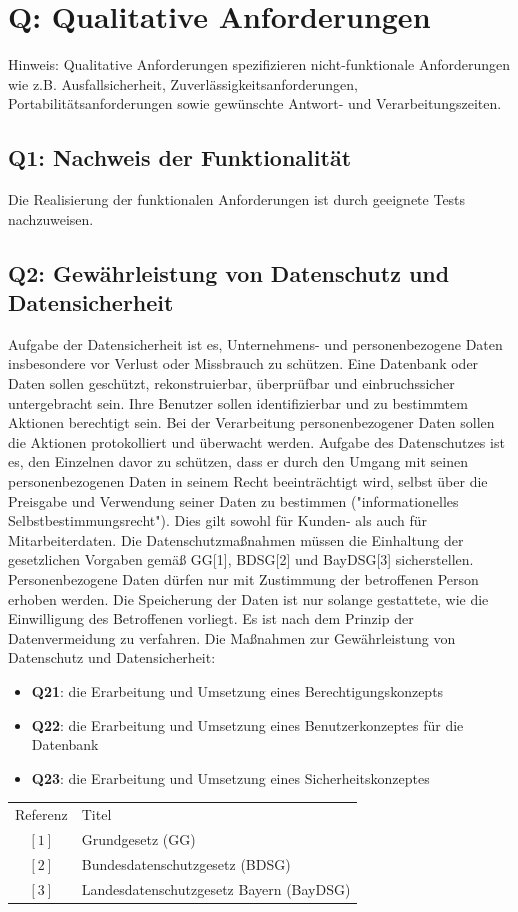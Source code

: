 \documentclass[10pt,a4paper]{scrartcl}
\begin{document}
\section{Q: Qualitative Anforderungen}
Hinweis: Qualitative Anforderungen spezifizieren nicht-funktionale Anforderungen wie z.B. Ausfallsicherheit, Zuverlässigkeitsanforderungen, Portabilitätsanforderungen sowie gewünschte Antwort- und Verarbeitungszeiten.

\subsection{Q1: Nachweis der Funktionalität}
Die Realisierung der funktionalen Anforderungen ist durch geeignete Tests nachzuweisen.

\subsection{Q2: Gewährleistung von Datenschutz und Datensicherheit}
Aufgabe der Datensicherheit ist es, Unternehmens- und personenbezogene Daten insbesondere vor Verlust oder Missbrauch zu schützen. Eine Datenbank oder Daten sollen geschützt, rekonstruierbar, überprüfbar und einbruchssicher untergebracht sein. Ihre Benutzer sollen identifizierbar und zu bestimmtem Aktionen berechtigt sein. Bei der Verarbeitung personenbezogener Daten sollen die Aktionen protokolliert und überwacht werden. Aufgabe des Datenschutzes ist es, den Einzelnen davor zu schützen, dass er durch den Umgang mit seinen personenbezogenen Daten in seinem Recht beeinträchtigt wird, selbst über die Preisgabe und Verwendung seiner Daten zu bestimmen ("informationelles Selbstbestimmungsrecht"). Dies gilt sowohl für Kunden- als auch für Mitarbeiterdaten. Die Datenschutzmaßnahmen müssen die Einhaltung der gesetzlichen Vorgaben gemäß GG[1], BDSG[2] und BayDSG[3] sicherstellen. Personenbezogene Daten dürfen nur mit Zustimmung der betroffenen Person erhoben werden. Die Speicherung der Daten ist nur solange gestattete, wie die Einwilligung des Betroffenen vorliegt. Es ist nach dem Prinzip der Datenvermeidung zu verfahren. Die Maßnahmen zur Gewährleistung von Datenschutz und Datensicherheit:
\begin{itemize}
	\item[] \textbf{Q21}: die Erarbeitung und Umsetzung eines Berechtigungskonzepts
	\item[] \textbf{Q22}: die Erarbeitung und Umsetzung eines Benutzerkonzeptes für die Datenbank
	\item[] \textbf{Q23}: die Erarbeitung und Umsetzung eines Sicherheitskonzeptes
\end{itemize}
\bigskip
\begin{tabular}{cl}
Referenz & Titel\\
$[1]$ & Grundgesetz (GG)\\
$[2]$ & Bundesdatenschutzgesetz (BDSG)\\
$[3]$ & Landesdatenschutzgesetz Bayern (BayDSG)
\end{tabular}
\end{document}
